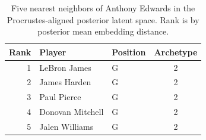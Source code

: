 \begin{table}[htbp]
  \centering\small
  \begin{tabular}{rllc}
    \toprule
    Rank & Player & Position & Archetype \\
    \midrule
    1 & LeBron James & G & 2 \\
    2 & James Harden & G & 2 \\
    3 & Paul Pierce & G & 2 \\
    4 & Donovan Mitchell & G & 2 \\
    5 & Jalen Williams & G & 2 \\
    \bottomrule
  \end{tabular}
  \caption{Five nearest neighbors of Anthony Edwards in the Procrustes-aligned posterior latent space. Rank is by posterior mean embedding distance.}
  \label{tab:Anthony_Edwards_neighbors}
\end{table}

